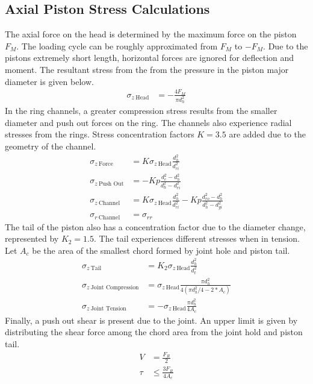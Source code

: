 \documentclass[10pt,a4paper]{article}
\begin{document}
	\subsection*{Axial Piston Stress Calculations}
	The axial force on the head is determined by the maximum force on the piston $F_M$. The loading cycle can be roughly approximated from $F_M$ to $-F_M$. Due to the pistons extremely short length, horizontal forces are ignored for deflection and moment. The resultant stress from the from the pressure in the piston major diameter is given below.
	\begin{align}
		\sigma_{z\ \text{Head}} &= - \frac{4 F_M}{\pi d_h^2}
	\end{align}
	In the ring channels, a greater compression stress results from the smaller diameter and push out forces on the ring. The channels also experience radial stresses from the rings. Stress concentration factors $K = 3.5$ are added due to the geometry of the channel.
	\begin{align}
		\sigma_{z\ \text{Force}} &=  K \sigma_{z\ \text{Head}} \frac{d_h^2}{d_{ri}^2} \\
		\sigma_{z\ \text{Push Out}} &= - K p \frac{d_{c}^2 - d_h^2}{d_h^2 - d_{ri}^2}\\
		\sigma_{z\ \text{Channel}} &= K \sigma_{z\ \text{Head}} \frac{d_h^2}{d_{ri}^2} - K p \frac{d_{ro}^2 - d_h^2}{d_h^2 - d_{gi}^2}\\
		\sigma_{r\ \text{Channel}} &= \sigma_{r r}
	\end{align}
	The tail of the piston also has a concentration factor due to the diameter change, represented by $K_2 = 1.5$. The tail experiences different stresses when in tension. Let $A_c$ be the area of the smallest chord formed by joint hole and piston tail.
	\begin{align}
		\sigma_{z\ \text{Tail}} &= K_2 \sigma_{z\ \text{Head}} \frac{d_h^2}{d_t^2}\\
		\sigma_{z\ \text{Joint Compression}} &= \sigma_{z\ \text{Head}} \frac{\pi d_h^2}{4 (\pi d_h^2/4-2*A_c)}\\
		\sigma_{z\ \text{Joint Tension}} &= -\sigma_{z\ \text{Head}} \frac{\pi d_h^2}{4 A_c}
	\end{align}
	Finally, a push out shear is present due to the joint. An upper limit is given by distributing the shear force among the chord area from the joint hold and piston tail.
	\begin{align}
		V &= \frac{F_R}{2}\\
		\tau &\leq \frac{3 F_R}{4 A_c}
	\end{align}
\end{document}
